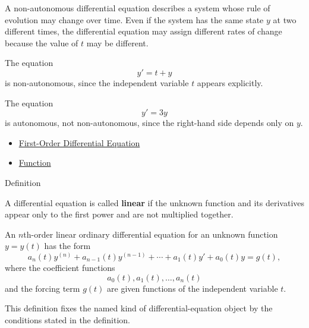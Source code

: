\begin{remark*}[Interpretation]
A non-autonomous differential equation describes a system whose rule of evolution may change over time. Even if the system has the same state $y$ at two different times, the differential equation may assign different rates of change because the value of $t$ may be different.
\end{remark*}

\begin{remark*}[Examples]
The equation
\[
y'=t+y
\]
is non-autonomous, since the independent variable $t$ appears explicitly.

The equation
\[
y'=3y
\]
is autonomous, not non-autonomous, since the right-hand side depends only on $y$.
\end{remark*}

\begin{dependencies}
\begin{itemize}
  \item \hyperref[def:ordinary-differential-equations-terminology-first-order-differential-equation]{First-Order Differential Equation}
  \item \hyperref[def:function]{Function}
\end{itemize}
\end{dependencies}


\begin{definitionbox}{Definition}
\begin{definition}
\label{def:ordinary-differential-equations-terminology-linear-differential-equation}
A differential equation is called \textbf{linear} if the unknown function and its derivatives appear only to the first power and are not multiplied together.

An $n$th-order linear ordinary differential equation for an unknown function $y=y(t)$ has the form
\[
a_n(t)y^{(n)}+a_{n-1}(t)y^{(n-1)}+\cdots+a_1(t)y'+a_0(t)y=g(t),
\]
where the coefficient functions
\[
a_0(t),a_1(t),\dots,a_n(t)
\]
and the forcing term $g(t)$ are given functions of the independent variable $t$.
\end{definition}
\end{definitionbox}

\begin{remark*}
This definition fixes the named kind of differential-equation object by the
conditions stated in the definition.
\end{remark*}

